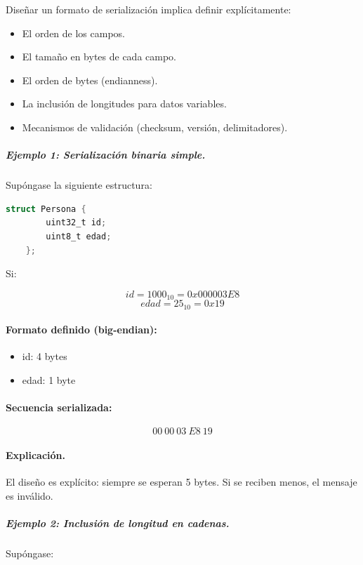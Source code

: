 \documentclass[12pt,twoside]{book}
\begin{document}
						Diseñar un formato de serialización implica definir explícitamente:
						
						\begin{itemize}
							\item El orden de los campos.
							\item El tamaño en bytes de cada campo.
							\item El orden de bytes (endianness).
							\item La inclusión de longitudes para datos variables.
							\item Mecanismos de validación (checksum, versión, delimitadores).
						\end{itemize}
						
						\subparagraph{Ejemplo 1: Serialización binaria simple.} Supóngase la siguiente estructura:
						
						\begin{lstlisting}[language=C]
	struct Persona {
		uint32_t id;
		uint8_t edad;
	}; \end{lstlisting}
						
						Si:
						
						\[
						id = 1000_{10} = 0x000003E8
						\]
						\[
						edad = 25_{10} = 0x19
						\]
						
						\paragraph{Formato definido (big-endian):}
						
						\begin{itemize}
							\item id: 4 bytes
							\item edad: 1 byte
						\end{itemize}
						
						\paragraph{Secuencia serializada:}
						
						\[
						00\ 00\ 03\ E8\ 19
						\]
						
						\paragraph{Explicación.} El diseño es explícito: siempre se esperan 5 bytes.  
						Si se reciben menos, el mensaje es inválido.
						
						\subparagraph{Ejemplo 2: Inclusión de longitud en cadenas.} Supóngase:
						
\end{document}
